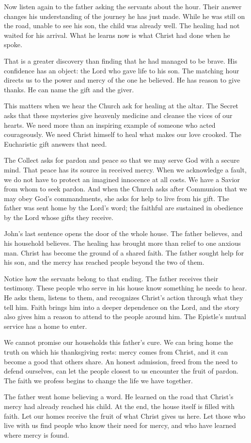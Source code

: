 Now listen again to the father asking the servants about the hour.
Their answer changes his understanding of the journey he has just
made. While he was still on the road, unable to see his son, the
child was already well. The healing had not waited for his arrival.
What he learns now is what Christ had done when he spoke.

That is a greater discovery than finding that he had managed to be
brave. His confidence has an object: the Lord who gave life to his
son. The matching hour directs us to the power and mercy of the
one he believed.
He has reason to give thanks. He can name the gift and the giver.

This matters when we hear the Church ask for healing at the altar.
The Secret asks that these mysteries give heavenly medicine and
cleanse the vices of our hearts. We need more than an inspiring
example of someone who acted courageously. We need Christ himself
to heal what makes our love crooked. The Eucharistic gift answers
that need.

The Collect asks for pardon and peace so that we may serve God with
a secure mind. That peace has its source in received mercy. When
we acknowledge a fault, we do not have to protect an imagined
innocence at all costs. We have a Savior from whom to seek pardon.
And when the Church asks after Communion that we may obey God's
commandments, she asks for help to live from his gift. The father
was sent home by the Lord's word; the faithful are sustained in
obedience by the Lord whose gifts they receive.

John's last sentence opens the door of the whole house. The father
believes, and his household believes. The healing has brought more
than relief to one anxious man. Christ has become the ground of
a shared faith. The father sought help for his son, and the mercy
has reached people beyond the two of them.

Notice how the servants belong to that ending. The father receives
their testimony. These people who serve in his house know something
he needs to hear. He asks them, listens to them, and recognizes
Christ's action through what they tell him. Faith brings him into
a deeper dependence on the Lord, and the story also gives him a
reason to attend to the people around him. The Epistle's mutual
service has a home to enter.

We cannot promise our households this father's cure. We can bring
home the truth on which his thanksgiving rests: mercy comes from
Christ, and it can become a good that others share. An honest
admission, freed from the need to defend ourselves, can let the
people closest to us encounter the fruit of pardon. The faith
we profess begins to change the life we have together.

The father went home believing a word. He learned on the road that
Christ's mercy had already reached his child. At the end, the house
itself is filled with faith. Let our homes receive the fruit of
what Christ gives us here. Let those who live with us find people
who know their need for mercy, and who have learned where mercy
is found.
